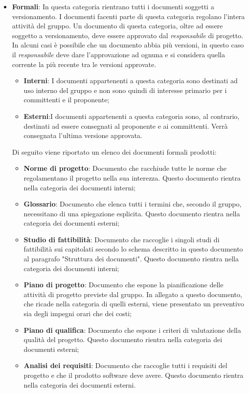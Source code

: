 \documentclass[../norme_di_progetto.tex]{subfiles}
\begin{document}
\begin{itemize}
    \item \textbf{Formali}: In questa categoria rientrano tutti i documenti soggetti a versionamento. I documenti facenti parte di questa categoria regolano l'intera attività del gruppo. Un documento di questa categoria, oltre ad essere soggetto a versionamento, deve essere approvato dal \emph{responsabile} di progetto. In alcuni casi è possibile che un documento abbia più versioni, in questo caso il \emph{responsabile} deve dare l'approvazione ad ognuna e si considera quella corrente la più recente tra le versioni approvate.\\
    \begin{itemize}
        \item \textbf{Interni}: I documenti appartenenti a questa categoria sono destinati ad uso interno del gruppo e non sono quindi di interesse primario per i committenti e il proponente;
        \item \textbf{Esterni}:I documenti appartenenti a questa categoria sono, al contrario, destinati ad essere consegnati al proponente e ai committenti. Verrà consegnata l'ultima versione approvata.
    \end{itemize}
    Di seguito viene riportato un elenco dei documenti formali prodotti:
    \begin{itemize}
        \item \textbf{Norme di progetto}: Documento che racchiude tutte le norme che regolamentano il progetto nella sua interezza. Questo documento rientra nella categoria dei documenti interni;
        \item \textbf{Glossario}: Documento che elenca tutti i termini che, secondo il gruppo, necessitano di una spiegazione esplicita. Questo documento rientra nella categoria dei documenti esterni;
        \item \textbf{Studio di fattibilità}: Documento che raccoglie i singoli studi di fattibilità sui capitolati secondo lo schema descritto in questo documento al paragrafo "Struttura dei documenti". Questo documento rientra nella categoria dei documenti interni;
        \item \textbf{Piano di progetto}: Documento che espone la pianificazione delle attività di progetto previste dal gruppo. In allegato a questo documento, che ricade nella categoria di quelli esterni, viene presentato un preventivo sia degli impegni orari che dei costi;
        \item \textbf{Piano di qualifica}: Documento che espone i criteri di valutazione della qualità del progetto. Questo documento rientra nella categoria dei documenti esterni;
        \item \textbf{Analisi dei requisiti}: Documento che raccoglie tutti i requisiti del progetto e che il prodotto software deve avere. Questo documento rientra nella categoria dei documenti esterni.
  \end{itemize}
  
\end{itemize}
\end{document}
